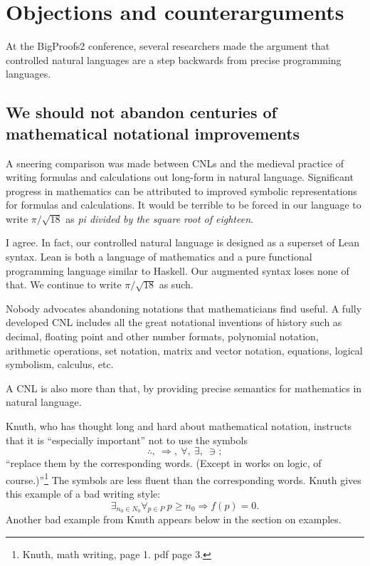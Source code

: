 \documentclass[12pt]{amsart}
\renewcommand{\~}{\ }
\renewcommand{\_}{\textunderscore}
\begin{document}
\section{Objections and counterarguments}

At the BigProofs2 conference, several researchers made the argument that
controlled natural languages are a step backwards from precise
programming languages.

\subsection{We should not abandon centuries of mathematical notational improvements}

A sneering comparison was made between CNLs and the medieval practice
of writing formulas and calculations out long-form in natural
language. Significant progress in mathematics can be attributed to
improved symbolic representations for formulas and calculations.  It
would be terrible to be forced in our language to write
$\pi/\sqrt{18}$ as {\it pi divided by the square root of eighteen}.

I agree.  In fact, our controlled natural language is designed as a
superset of Lean syntax.  Lean is both a language of mathematics and a
pure functional programming language similar to Haskell.  Our
augmented syntax loses none of that.  We continue to write
$\pi/\sqrt{18}$ as such.

Nobody advocates abandoning notations that mathematicians find useful.
A fully developed CNL includes all the great notational inventions of
history such as decimal, floating point and other number formats,
polynomial notation, arithmetic operations, set notation, matrix and
vector notation, equations, logical symbolism, calculus, etc.

A CNL is also more than that, by providing precise
semantics for mathematics in natural language.

Knuth, who has
thought long and hard about mathematical notation, instructs that
it is ``especially important'' not to use the symbols
\[
\therefore,\ \Rightarrow,\ \forall,\ \exists,\ \ni;
\]
``replace them by the corresponding words.  (Except in works on logic,
of course.)''\footnote{Knuth, math writing, page 1. pdf page 3.}  The
symbols are less fluent than the corresponding words.  Knuth gives
this example of a bad writing style:
\[
\exists_{n_0\in N_0} \forall_{p\in P}\ p\ge n_0 \Rightarrow f(p)=0.
\]
Another bad example from Knuth appears below in the section on examples.
\end{document}
